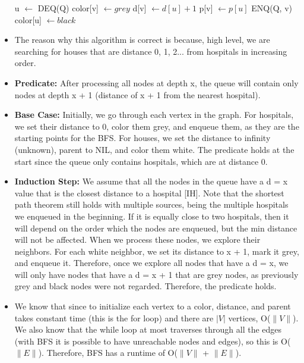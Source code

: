 \documentclass{article}
\begin{document}
\begin{itemize}
\begin{algorithm} [H]
\begin{algorithmic}[1]
            \State u $\gets$ DEQ(Q)
                    \State color[v] $\gets grey$
                    \State d[v] $\gets d[u] + 1$
                    \State p[v] $\gets p[u]$
                    \State ENQ(Q, v)
                \EndIf
            \EndFor 
        \EndWhile
        \State color[u] $\gets black$
        \end{algorithmic}
        \end{algorithm}
     \item The reason why this algorithm is correct is because, high level, we are searching for houses that are distance 0, 1, 2... from hospitals in increasing order.
     \item \textbf{Predicate: }After processing all nodes at depth x, the queue will contain only nodes at depth x + 1 (distance of x + 1 from the nearest hospital).
    \item \textbf{Base Case: }Initially, we go through each vertex in the graph. For hospitals, we set their distance to 0, color them grey, and enqueue them, as they are the starting points for the BFS. For houses, we set the distance to infinity (unknown), parent to NIL, and color them white. The predicate holds at the start since the queue only contains hospitals, which are at distance 0.
    \item \textbf{Induction Step: } We assume that all the nodes in the queue have a d = x value that is the closest distance to a hospital [IH]. Note that the shortest path theorem still holds with multiple sources, being the multiple hospitals we enqueued in the beginning. If it is equally close to two hospitals, then it will depend on the order which the nodes are enqueued, but the min distance will not be affected. When we process these nodes, we explore their neighbors. For each white neighbor, we set its distance to x + 1, mark it grey, and enqueue it. Therefore, once we explore all nodes that have a d = x, we will only have nodes that have a d = x + 1 that are grey nodes, as previously grey and black nodes were not regarded. Therefore, the predicate holds. 
    \item We know that since to initialize each vertex to a color, distance, and parent takes constant time (this is the for loop) and there are $|V|$ vertices, O($\|V\|$). We also know that the while loop at most traverses through all the edges (with BFS it is possible to have unreachable nodes and edges), so this is O($\|E\|$). Therefore, BFS has a runtime of O($\|V\|$ + $\|E\|$).
\end{itemize}
\end{document}
